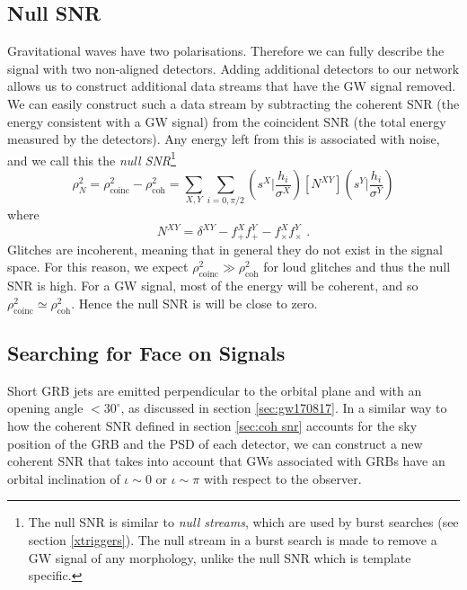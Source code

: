 \documentclass[11pt]{cuthesis}
\newcommand{\fs}{\text{ .}}
\begin{document}
\subsection{Null SNR} \label{sec:null snr}
Gravitational waves have two polarisations. Therefore we can fully describe the signal with two non-aligned detectors. Adding additional detectors to our network allows us to construct additional data streams that have the GW signal removed. We can easily construct such a data stream by subtracting the coherent SNR (the energy consistent with a GW signal) from the coincident SNR (the total energy measured by the detectors). Any energy left from this is associated with noise, and we call this the \textit{null SNR}\footnote{The null SNR is similar to \textit{null streams}, which are used by burst searches (see section \ref{xtriggers}). The null stream in a burst search is made to remove a GW signal of any morphology, unlike the null SNR which is template specific.}
\begin{equation} \label{null snr}
\rho_N^2 = \rho_\text{coinc}^2 - \rho_\text{coh}^2 = \sum_{X,Y} \sum_{i=0,\pi/2} \left( s^X \bigg| \frac{h_i}{\sigma^X} \right) [N^{XY}]  \left( s^Y \bigg| \frac{h_i}{\sigma^Y} \right)
\end{equation} 
where
\begin{equation}
N^{XY} = \delta^{XY} - f^X_{+}f^Y_{+} - f^X_{\times}f^Y_{\times} \fs
\end{equation}
Glitches are incoherent, meaning that in general they do not exist in the signal space. For this reason, we expect $\rho_\text{coinc}^2 \gg \rho_\text{coh}^2$ for loud glitches and thus the null SNR is high. For a GW signal, most of the energy will be coherent, and so $\rho_\text{coinc}^2 \simeq \rho_\text{coh}^2$. Hence the null SNR is will be close to zero.

\subsection{Searching for Face on Signals} \label{sec:circ pol}
Short GRB jets are emitted perpendicular to the orbital plane and with an opening angle $<30^\circ$, as discussed in section \ref{sec:gw170817}. In a similar way to how the coherent SNR defined in section \ref{sec:coh snr} accounts for the sky position of the GRB and the PSD of each detector, we can construct a new coherent SNR that takes into account that GWs associated with GRBs have an orbital inclination of $\iota \sim 0$ or $\iota \sim \pi$ with respect to the observer.
\end{document}
